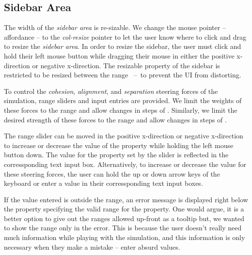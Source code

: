 \documentclass[../main]{subfiles}
\begin{document}
\subsection{Sidebar Area}
\label{sidebarArea}

The width of the {\em sidebar area} is re-sizable. We change the mouse pointer -- affordance -- to the {\em col-resize} pointer to let the user know where to click and drag to resize the {\em sidebar area}. In order to resize the sidebar, the user must click and hold their left mouse button while dragging their mouse in either the positive x-direction or negative x-direction. The resizable property of the sidebar is restricted to be resized between the range ~--~to prevent the UI from distorting.

To control the {\em cohesion}, {\em alignment}, and {\em separation} steering forces of the simulation, range sliders and input entries are provided. We limit the weights of these forces to the range  and allow changes in steps of . Similarly, we limit the desired strength of these forces to the range  and allow changes in steps of .

The range slider can be moved in the positive x-direction or negative x-direction to increase or decrease the value of the property while holding the left mouse button down. The value for the property set by the slider is reflected in the corressponding text input box. Alternatively, to increase or decrease the value for these steering forces, the user can hold the up or down arrow keys of the keyboard or enter a value in their corressponding text input boxes.

If the value entered is outside the range, an error message is displayed right below the property specifying the valid range for the property. One would argue, it is a better option to give out the ranges allowed up-front as a tooltip but, we wanted to show the range only in the error. This is because the user doesn't really need much information while playing with the simulation, and this information is only necessary when they make a mistake -- enter absurd values.
\end{document}
